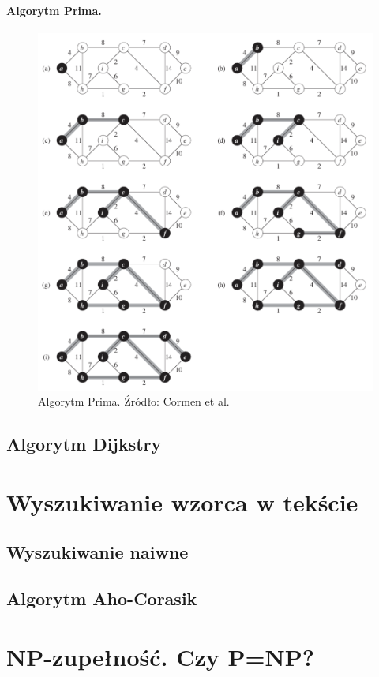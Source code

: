 \documentclass[10pt, oneside]{article}
\theoremstyle{remark}
\begin{document}
\paragraph{Algorytm Prima.}
\begin{figure}[htpb]
	\centering
	\includegraphics[width=.9\textwidth]{figures/prim}
	\caption{Algorytm Prima. Źródło: Cormen et al.}
\end{figure}

\subsection{Algorytm Dijkstry}

\section{Wyszukiwanie wzorca w tekście}

\subsection{Wyszukiwanie naiwne}

\subsection{Algorytm Aho-Corasik}

\section{NP-zupełność. Czy P=NP?}
\end{document}
